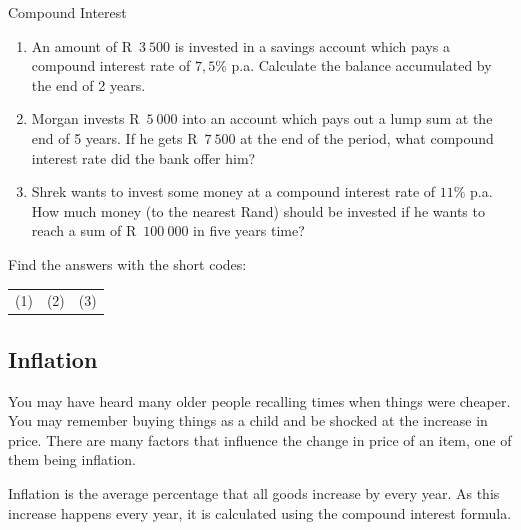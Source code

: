 \begin{exercises}{Compound Interest}
    \begin{enumerate}[label=\textbf{\arabic*}.]
	\item An amount of R~$3~500$ is invested in a savings account which pays a compound interest rate of $7,5\%$ p.a. Calculate the balance accumulated by the end of 2 years.

	\item Morgan invests R~$5~000$ into an account which pays out a lump sum at the end of 5 years. If he gets R~$7~500$ at the end of the period, what compound interest rate did the bank offer him?

	\item Shrek wants to invest some money at a compound interest rate of $11\%$ p.a. How much money (to the nearest Rand) should be invested if he wants to reach a sum of R~$100~000$ in five years time?\\
    \end{enumerate}

    Find the answers with the short codes:\\
    \begin{tabularx}{\textwidth}{ XXX }
	(1)	&	(2)	&	(3)\\
    \end{tabularx}
\end{exercises}


\subsection{Inflation}

You may have heard many older people recalling times when things were cheaper. You may remember buying things as a child and be shocked at the increase in price. There are many factors that influence the change in price of an item, one of them being inflation.\par

Inflation is the average percentage that all goods increase by every year. As this increase happens every year, it is calculated using the compound interest formula.


